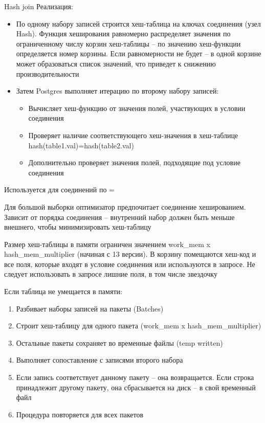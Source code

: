 \documentclass[12pt]{article}
\begin{document}
\begin{defin}{Hash join}
    Реализация:

    \begin{itemize}
        \item По одному набору записей строится хеш-таблица на ключах соединения (узел Hash). Функция хеширования равномерно распределяет значения по ограниченному числу корзин хеш-таблицы -- по значению хеш-функции определяется номер корзины. Если равномерности не будет -- в одной корзине может образоваться список значений, что приведет к снижению производительности 
        \item Затем Postgres выполняет итерацию по второму набору записей: 
        
        \begin{itemize}
            \item Вычисляет хеш-функцию от значения полей, участвующих в условии соединения 
            \item Проверяет наличие соответствующего хеш-значения в хеш-таблице hash(table1.val)=hash(table2.val)
            \item Дополнительно проверяет значения полей, подходящие под условие соединения 
        \end{itemize}
    \end{itemize}

    Используется для соединений по =

    Для большой выборки оптимизатор предпочитает соединение хешированием. Зависит от порядка соединения -- внутренний набор должен быть меньше внешнего, чтобы минимизировать хеш-таблицу 

    Размер хеш-таблицы в памяти ограничен значением work\_mem x hash\_mem\_multiplier (начиная с 13 версии). В корзину помещаются хеш-код и все поля, которые входят в условие соединения или используются в запросе. Не следует использовать в запросе лишние поля, в том числе звездочку

    Если таблица не умещается в памяти:

    \begin{enumerate}
        \item Разбивает наборы записей на пакеты (Batches)
        \item Строит хеш-таблицу для одного пакета (work\_mem x hash\_mem\_multiplier)
        \item Остальные пакеты сохраняет во временные файлы (temp written)
        \item Выполняет сопоставление с записями второго набора 
        \item Если запись соответствует данному пакету -- она возвращается. Если строка принадлежит другому пакету, она сбрасывается на диск -- в свой временный файл
        \item Процедура повторяется для всех пакетов 
    \end{enumerate}
\end{defin}
\end{document}
